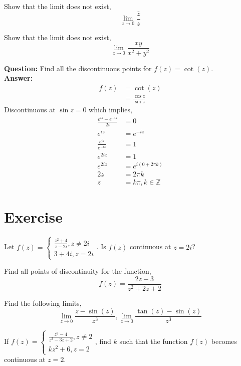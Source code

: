 \begin{example}
    Show that the limit does not exist, 
    $$\lim_{z\rightarrow0}\frac{\bar z}{z}$$
\end{example}

\begin{example}
    Show that the limit does not exist, 
    $$\lim_{z\rightarrow0}\frac{xy}{x^2+y^2}$$
\end{example}
\begin{example}
    \textbf{Question:} Find all the discontinuous points for $f(z)=\cot(z)$.\\
    \textbf{Answer:} 
    \begin{align*}
        f(z)&=\cot(z)\\
        &= \frac{\cos z}{\sin z}
    \end{align*}
    Discontinuous at $\sin z=0$ which implies, 
    \begin{align*}
        \frac{e^{iz}-e^{-iz}}{2i}&=0\\
        e^{iz}&=e^{-iz}\\
        \frac{e^{iz}}{e^{-iz}}&=1\\
        e^{2iz}&=1\\
        e^{2iz}&=e^{i(0+2\pi k)}\\
        2z&= 2\pi k\\
        z &= k\pi,k\in\mathbb Z 
    \end{align*}
\end{example}







\section{Exercise}
\begin{exercise}
Let $f(z)=\begin{cases}
    \frac{z^2+4}{z-2i},z\neq 2i\\
    3+4i,z=2i
\end{cases}$. Is $f(z)$ continuous at $z=2i$?
\end{exercise}
\begin{exercise}
    Find all points of discontinuity for the function, $$f(z)=\frac{2z-3}{z^2+2z+2}$$
\end{exercise}
\begin{exercise}
    Find the following limits,
$$\lim_{z\rightarrow0}\frac{z-\sin(z)}{z^3}, \lim_{z\rightarrow0}\frac{\tan(z)-\sin(z)}{z^3}$$
\end{exercise}
\begin{exercise}
    If $f(z)=\begin{cases}
        \frac{z^2-4}{z^2-3z+2},z\neq 2\\
        kz^2+6,z=2
    \end{cases}$, find $k$ such that the function $f(z)$ becomes continuous at $z=2$. 
\end{exercise}


